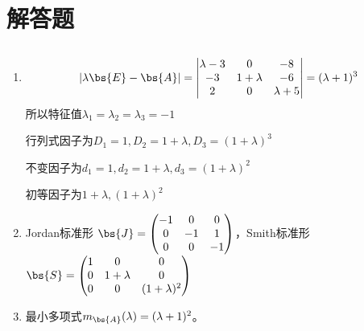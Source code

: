 \documentclass[12pt, a4paper, oneside, UTF8]{ctexbook}
\begin{document}
\section{解答题}
\subsection{}
\begin{enumerate}
\item \begin{align*}
|\lambda \bs{E}-\bs{A}|=\begin{vmatrix}
    \lambda-3 &0 &-8 \\
    -3 & 1+\lambda & -6 \\
    2 &0 &\lambda +5
\end{vmatrix}=(\lambda+1)^3
\end{align*}
所以特征值$\lambda_1=\lambda_2=\lambda_3=-1$

行列式因子为$D_1=1,D_2=1+\lambda,D_3=(1+\lambda)^3$

不变因子为$d_1=1,d_2=1+\lambda,d_3=(1+\lambda)^2$

初等因子为$1+\lambda,(1+\lambda)^2$

\item Jordan标准形
$\bs{J}=\begin{pmatrix}
    -1 & 0 & 0\\
    0& -1 & 1 \\
    0& 0 & -1
\end{pmatrix}$，Smith标准形$\bs{S}=\begin{pmatrix}
    1 & 0 & 0\\
    0& 1+\lambda & 0 \\
    0& 0 & (1+\lambda)^2
\end{pmatrix}$

\item 最小多项式$m_{\bs{A}}(\lambda)=(\lambda+1)^2$。
\end{enumerate}
\end{document}
